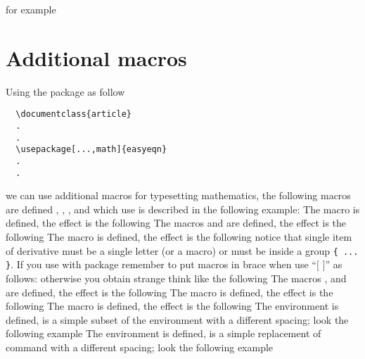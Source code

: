 \documentclass[a4paper]{article}
\begin{document}
for example
%
%


\section{Additional macros}
Using the package as follow
\begin{verbatim}
  \documentclass{article}
  .
  .
  \usepackage[...,math]{easyeqn}
  .
  .
\end{verbatim}
%
we can use additional macros for typesetting mathematics, the 
following macros are defined  , ,
,  and   which use is described 
in the following example:
%
%
The macro  is defined, the effect is the following
%
%
The macros  and  are defined,
the effect is the following
%
%
The macro  is defined, the effect is the following
%
%
notice that single item of derivative must be a single letter (or a 
macro) or must be inside a group \verb'{ ... }'.
If you use  with package 
remember to put macros in brace when use ``$[$ $]$'' as follows:
%
%
otherwise you obtain strange think like the following
%
%
The macros ,  and  are defined,
the effect is the following
%
%
The macro  is defined, the effect is the following
%
%
The macro  is defined, the effect is the following
%
%
The environment  is defined, is a simple subset of the 
environment  with a different spacing; look the following 
example
%
%
The environment  is defined, is a simple replacement
of  command with a different spacing; look the following 
example
%
%
\end{document}
